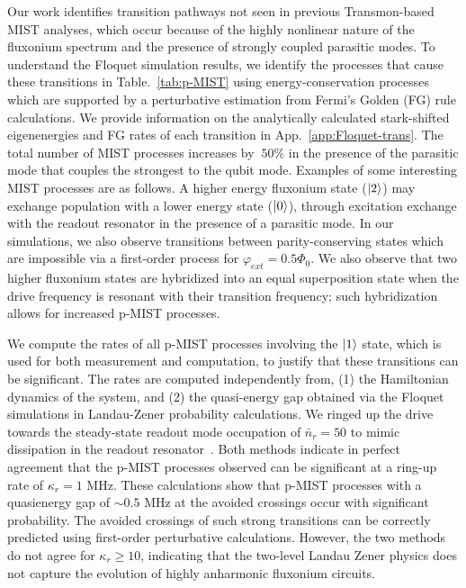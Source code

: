 \documentclass[%
reprint,
superscriptaddress,
 amsmath,amssymb,
 aps,
 prx,
longbibliography,
floatfix,
]{revtex4-2}
\begin{document}
Our work identifies transition pathways not seen in previous Transmon-based MIST analyses, which occur because of the highly nonlinear nature of the fluxonium spectrum and the presence of strongly coupled parasitic modes. To understand the Floquet simulation results, we identify the processes that cause these transitions in Table.~\ref{tab:p-MIST} using energy-conservation processes which are supported by a perturbative estimation from Fermi's Golden (FG) rule calculations. We provide information on the analytically calculated stark-shifted eigenenergies and FG rates of each transition in App.~\ref{app:Floquet-trans}. The total number of MIST processes increases by $~50\%$ in the presence of the parasitic mode that couples the strongest to the qubit mode. Examples of some interesting MIST processes are as follows. A higher energy fluxonium state ($\ket{2}$) may exchange population with a lower energy state ($\ket{0}$), through excitation exchange with the readout resonator in the presence of a parasitic mode. In our simulations, we also observe transitions between parity-conserving states which are impossible via a first-order process for $\varphi_{ext}=0.5\Phi_0$. We also observe that two higher fluxonium states are hybridized into an equal superposition state when the drive frequency is resonant with their transition frequency; such hybridization allows for increased p-MIST processes. 

We compute the rates of all p-MIST processes involving the $\ket{1}$ state, which is used for both measurement and computation, to justify that these transitions can be significant. The rates are computed independently from, (1) the Hamiltonian dynamics of the system, and (2) the quasi-energy gap obtained via the Floquet simulations in Landau-Zener probability calculations. We ringed up the drive towards the steady-state readout mode occupation of $\bar n_r=50$ to mimic dissipation in the readout resonator~\cite{dumas2024unified,cohen2023reminiscence}. Both methods indicate in perfect agreement that the p-MIST processes observed can be significant at a ring-up rate of $\kappa_r=1$ MHz. These calculations show that p-MIST processes with a quasienergy gap  of $\sim 0.5$ MHz at the avoided crossings occur with significant probability. The avoided crossings of such strong transitions can be correctly predicted using first-order perturbative calculations. However, the two methods do not agree for $\kappa_r\ge 10$, indicating that the two-level Landau Zener physics does not capture the evolution of highly anharmonic fluxonium circuits. 
\end{document}
